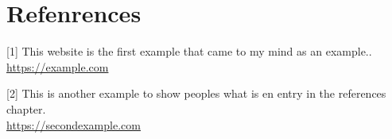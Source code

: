 \documentclass[../main.tex]{subfiles}
\begin{document}
	\chapter*{Refenrences}
	{
		[1] This website is the first example that came to my mind as an example.. \url{https://example.com}

		[2] This is another example to show peoples what is en entry in the references chapter. \\
		\url{https://secondexample.com}
		

		\vspace{10pt}

	}
\end{document}
